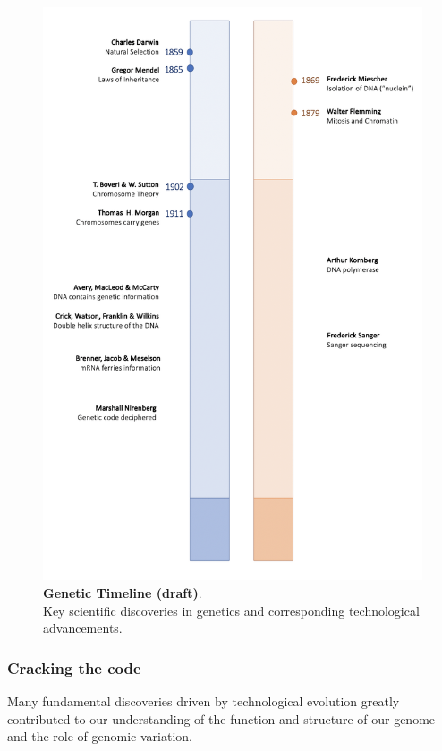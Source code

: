 \begin{figure}[htbp]
\centering
\includegraphics[width=13cm]{Chapter1/Fig/genetic_timeline_draft.png}
\caption[Genetic Timeline]{\textbf{Genetic Timeline (draft)}.\\
Key scientific discoveries in genetics and corresponding technological advancements.}
\label{fig:genetic_timeline}
\end{figure}

\subsubsection{Cracking the code}

Many fundamental discoveries driven by technological evolution greatly contributed to
our understanding of the function and structure of our genome and the role of genomic variation.\\

